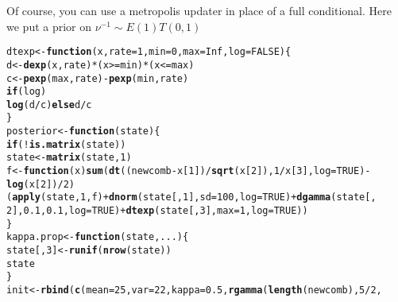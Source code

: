 \documentclass{article}\usepackage[]{graphicx}\usepackage[]{color}
\makeatletter
\newcommand{\hlnum}[1]{\textcolor[rgb]{0.686,0.059,0.569}{#1}}%
\newcommand{\hlopt}[1]{\textcolor[rgb]{0,0,0}{#1}}%
\newcommand{\hlstd}[1]{\textcolor[rgb]{0.345,0.345,0.345}{#1}}%
\newcommand{\hlkwa}[1]{\textcolor[rgb]{0.161,0.373,0.58}{\textbf{#1}}}%
\newcommand{\hlkwb}[1]{\textcolor[rgb]{0.69,0.353,0.396}{#1}}%
\newcommand{\hlkwc}[1]{\textcolor[rgb]{0.333,0.667,0.333}{#1}}%
\newcommand{\hlkwd}[1]{\textcolor[rgb]{0.737,0.353,0.396}{\textbf{#1}}}%
\newenvironment{kframe}{%
 \def\at@end@of@kframe{}%
 \ifinner\ifhmode%
  \def\at@end@of@kframe{\end{minipage}}%
  \begin{minipage}{\columnwidth}%
 \fi\fi%
 \def\FrameCommand##1{\hskip\@totalleftmargin \hskip-\fboxsep
 \colorbox{shadecolor}{##1}\hskip-\fboxsep
     \hskip-\linewidth \hskip-\@totalleftmargin \hskip\columnwidth}%
 \MakeFramed {\advance\hsize-\width
   \@totalleftmargin\z@ \linewidth\hsize
   \@setminipage}}%
 {\par\unskip\endMakeFramed%
 \at@end@of@kframe}
\newenvironment{knitrout}{}{} %
\makeatother
\begin{document}
Of course, you can use a metropolis updater in place of a full
conditional. Here we put a prior on $\nu^{-1} \sim E(1)T(0,1)$
\begin{knitrout}
\color{fgcolor}\begin{kframe}
\begin{alltt}
\hlstd{dtexp} \hlkwb{<-} \hlkwa{function}\hlstd{(}\hlkwc{x}\hlstd{,} \hlkwc{rate} \hlstd{=} \hlnum{1}\hlstd{,} \hlkwc{min} \hlstd{=} \hlnum{0}\hlstd{,} \hlkwc{max} \hlstd{=} \hlnum{Inf}\hlstd{,} \hlkwc{log} \hlstd{=} \hlnum{FALSE}\hlstd{) \{}
    \hlstd{d} \hlkwb{<-} \hlkwd{dexp}\hlstd{(x, rate)} \hlopt{*} \hlstd{(x} \hlopt{>=} \hlstd{min)} \hlopt{*} \hlstd{(x} \hlopt{<=} \hlstd{max)}
    \hlstd{c} \hlkwb{<-} \hlkwd{pexp}\hlstd{(max, rate)} \hlopt{-} \hlkwd{pexp}\hlstd{(min, rate)}
    \hlkwa{if} \hlstd{(log)}
        \hlkwd{log}\hlstd{(d}\hlopt{/}\hlstd{c)} \hlkwa{else} \hlstd{d}\hlopt{/}\hlstd{c}
\hlstd{\}}
\hlstd{posterior} \hlkwb{<-} \hlkwa{function}\hlstd{(}\hlkwc{state}\hlstd{) \{}
    \hlkwa{if} \hlstd{(}\hlopt{!}\hlkwd{is.matrix}\hlstd{(state))}
        \hlstd{state} \hlkwb{<-} \hlkwd{matrix}\hlstd{(state,} \hlnum{1}\hlstd{)}
    \hlstd{f} \hlkwb{<-} \hlkwa{function}\hlstd{(}\hlkwc{x}\hlstd{)} \hlkwd{sum}\hlstd{(}\hlkwd{dt}\hlstd{((newcomb} \hlopt{-} \hlstd{x[}\hlnum{1}\hlstd{])}\hlopt{/}\hlkwd{sqrt}\hlstd{(x[}\hlnum{2}\hlstd{]),} \hlnum{1}\hlopt{/}\hlstd{x[}\hlnum{3}\hlstd{],} \hlkwc{log} \hlstd{=} \hlnum{TRUE}\hlstd{)} \hlopt{-}
        \hlkwd{log}\hlstd{(x[}\hlnum{2}\hlstd{])}\hlopt{/}\hlnum{2}\hlstd{)}
    \hlstd{(}\hlkwd{apply}\hlstd{(state,} \hlnum{1}\hlstd{, f)} \hlopt{+} \hlkwd{dnorm}\hlstd{(state[,} \hlnum{1}\hlstd{],} \hlkwc{sd} \hlstd{=} \hlnum{100}\hlstd{,} \hlkwc{log} \hlstd{=} \hlnum{TRUE}\hlstd{)} \hlopt{+} \hlkwd{dgamma}\hlstd{(state[,}
        \hlnum{2}\hlstd{],} \hlnum{0.1}\hlstd{,} \hlnum{0.1}\hlstd{,} \hlkwc{log} \hlstd{=} \hlnum{TRUE}\hlstd{)} \hlopt{+} \hlkwd{dtexp}\hlstd{(state[,} \hlnum{3}\hlstd{],} \hlkwc{max} \hlstd{=} \hlnum{1}\hlstd{,} \hlkwc{log} \hlstd{=} \hlnum{TRUE}\hlstd{))}
\hlstd{\}}
\hlstd{kappa.prop} \hlkwb{<-} \hlkwa{function}\hlstd{(}\hlkwc{state}\hlstd{,} \hlkwc{...}\hlstd{) \{}
    \hlstd{state[,} \hlnum{3}\hlstd{]} \hlkwb{<-} \hlkwd{runif}\hlstd{(}\hlkwd{nrow}\hlstd{(state))}
    \hlstd{state}
\hlstd{\}}
\hlstd{init} \hlkwb{<-} \hlkwd{rbind}\hlstd{(}\hlkwd{c}\hlstd{(}\hlkwc{mean} \hlstd{=} \hlnum{25}\hlstd{,} \hlkwc{var} \hlstd{=} \hlnum{22}\hlstd{,} \hlkwc{kappa} \hlstd{=} \hlnum{0.5}\hlstd{,} \hlkwd{rgamma}\hlstd{(}\hlkwd{length}\hlstd{(newcomb),} \hlnum{5}\hlopt{/}\hlnum{2}\hlstd{,}

\end{alltt}
\end{kframe}
\end{knitrout}
\end{document}
